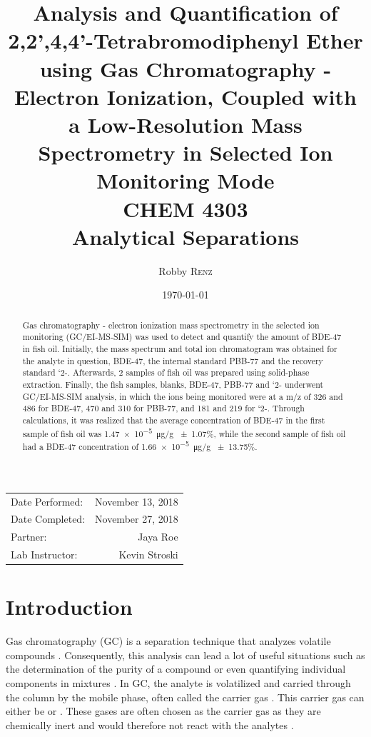 \documentclass[a4paper, 12pt]{article}
\title{Analysis and Quantification of 2,2',4,4'-Tetrabromodiphenyl Ether using Gas Chromatography - Electron Ionization, Coupled with a Low-Resolution Mass Spectrometry in Selected Ion Monitoring Mode \\ CHEM 4303 \\ Analytical Separations} %
\author{Robby \textsc{Renz}} %
\date{\today} %
\begin{document}
\maketitle %

\begin{center}
	\begin{tabular}{l r}
		Date Performed: & November 13, 2018 \\ %
		Date Completed: & November 27, 2018 \\
		Partner: & Jaya Roe \\ %
		Lab Instructor: & Kevin Stroski %
	\end{tabular}
\end{center}


\begin{abstract}
	Gas chromatography - electron ionization mass spectrometry in the selected ion monitoring (GC/EI-MS-SIM) was used to detect and quantify the amount of BDE-47 in fish oil. Initially, the mass spectrum and total ion chromatogram was obtained for the analyte in question, BDE-47, the internal standard PBB-77 and the recovery standard `2-. Afterwards, 2 samples of fish oil was prepared using solid-phase extraction. Finally, the fish samples, blanks, BDE-47, PBB-77 and `2- underwent GC/EI-MS-SIM analysis, in which the ions being monitored were at a m/z of 326 and 486 for BDE-47, 470 and 310 for PBB-77, and 181 and 219 for `2-. Through calculations, it was realized that the average concentration of BDE-47 in the first sample of fish oil was \SI{1.47e-5}{\ug/g} \num{+-1.07}\%, while the second sample of fish oil had a BDE-47 concentration of \SI{1.66e-5}{\ug/g} \num{+-13.75}\%.
\end{abstract}
\newpage


\section{Introduction}
Gas chromatography (GC) is a separation technique that analyzes volatile compounds \cite{vitha_chromatography:_2017}. Consequently, this analysis can lead a lot of useful situations such as the determination of the purity of a compound or even quantifying individual components in mixtures \cite{vitha_chromatography:_2017}. In GC, the analyte is volatilized and carried through the column by the mobile phase, often called the carrier gas \cite{harris}. This carrier gas can either be  or  \cite{harris}. These gases are often chosen as the carrier gas as they are chemically inert and would therefore not react with the analytes \cite{vitha_chromatography:_2017}.
\end{document}
